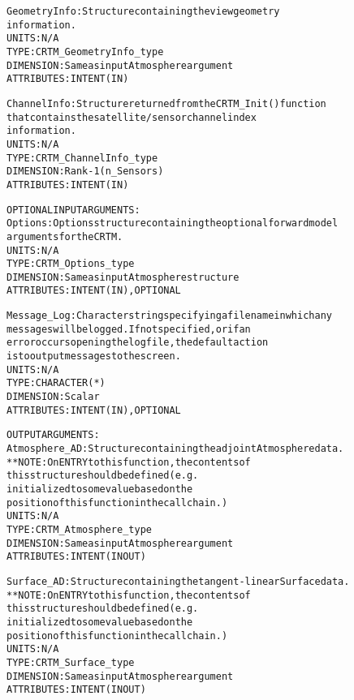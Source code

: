 \begin{alltt}
        GeometryInfo:   Structure containing the view geometry
                        information.
                        UNITS:      N/A
                        TYPE:       CRTM_GeometryInfo_type
                        DIMENSION:  Same as input Atmosphere argument
                        ATTRIBUTES: INTENT(IN)
 
        ChannelInfo:    Structure returned from the CRTM_Init() function
                        that contains the satellite/sensor channel index
                        information.
                        UNITS:      N/A
                        TYPE:       CRTM_ChannelInfo_type
                        DIMENSION:  Rank-1 (n_Sensors)
                        ATTRIBUTES: INTENT(IN)
 
  OPTIONAL INPUT ARGUMENTS:
        Options:        Options structure containing the optional forward model
                        arguments for the CRTM.
                        UNITS:      N/A
                        TYPE:       CRTM_Options_type
                        DIMENSION:  Same as input Atmosphere structure
                        ATTRIBUTES: INTENT(IN), OPTIONAL
 
        Message_Log:    Character string specifying a filename in which any
                        messages will be logged. If not specified, or if an
                        error occurs opening the log file, the default action
                        is to output messages to the screen.
                        UNITS:      N/A
                        TYPE:       CHARACTER(*)
                        DIMENSION:  Scalar
                        ATTRIBUTES: INTENT(IN), OPTIONAL
 
  OUTPUT ARGUMENTS:
        Atmosphere_AD:  Structure containing the adjoint Atmosphere data.
                        **NOTE: On ENTRY to this function, the contents of
                                this structure should be defined (e.g.
                                initialized to some value based on the
                                position of this function in the call chain.)
                        UNITS:      N/A
                        TYPE:       CRTM_Atmosphere_type
                        DIMENSION:  Same as input Atmosphere argument
                        ATTRIBUTES: INTENT(IN OUT)
 
        Surface_AD:     Structure containing the tangent-linear Surface data.
                        **NOTE: On ENTRY to this function, the contents of
                                this structure should be defined (e.g.
                                initialized to some value based on the
                                position of this function in the call chain.)
                        UNITS:      N/A
                        TYPE:       CRTM_Surface_type
                        DIMENSION:  Same as input Atmosphere argument
                        ATTRIBUTES: INTENT(IN OUT)
 

\end{alltt}
